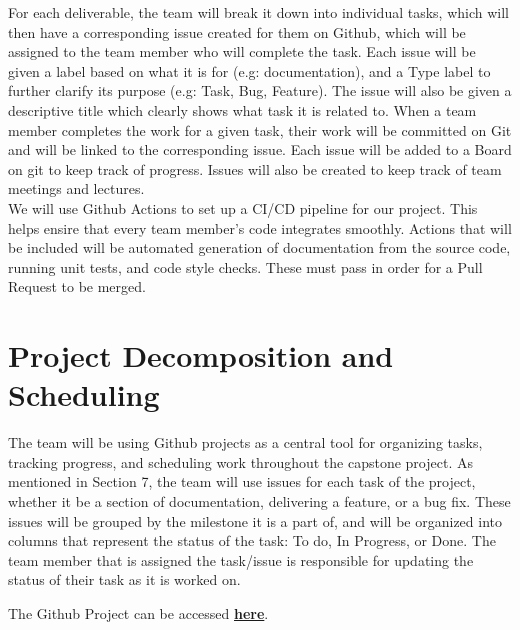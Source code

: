 \documentclass{article}
\begin{document}
 For each deliverable, the team will break it down into individual tasks, which will then have a corresponding issue created for them on Github, which will be assigned to the team member who will complete the task.
Each issue will be given a label based on what it is for (e.g: documentation), and a Type label to further clarify its purpose (e.g: Task, Bug, Feature). 
The issue will also be given a descriptive title which clearly shows what task it is related to. When a team member completes the work for a given task, their work will
be committed on Git and will be linked to the corresponding issue. Each issue will be added to a Board on git to keep track of progress. Issues will also be created to keep track of team meetings and lectures. \\

 We will use Github Actions to set up a CI/CD pipeline for our project. This helps ensire that every team member's code integrates smoothly. Actions that will be included will be
automated generation of documentation from the source code, running unit tests, and code style checks. These must pass in order for a Pull Request to be merged.

\section{Project Decomposition and Scheduling}

The team will be using Github projects as a central tool for organizing tasks, tracking progress, and scheduling work throughout the capstone project. As mentioned in Section 7,
the team will use issues for each task of the project, whether it be a section of documentation, delivering a feature, or a bug fix. These issues will be grouped by the milestone it
is a part of, and will be organized into columns that represent the status of the task: To do, In Progress, or Done. The team member that is assigned the task/issue is responsible
for updating the status of their task as it is worked on.\newline

\noindent The Github Project can be accessed \href{https://github.com/orgs/hitchly/projects/2/views/1}{\bf here}.\\

\end{document}
